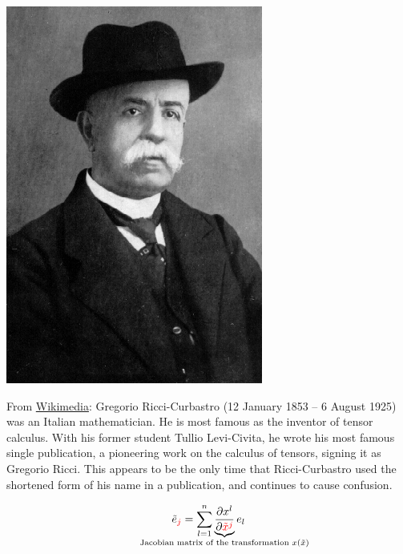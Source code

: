 \documentclass[../main.tex]{subfiles}
\begin{document}
\begin{marginfigure}
	\includegraphics[width=1\linewidth]{images/Ricci_Curbastro_(cropped).jpg}
	\caption[Photo of Gregorio Ricci Cubastro]{From \href{https://commons.wikimedia.org/wiki/File:Ricci_Curbastro_(cropped).jpg}{Wikimedia}: Gregorio Ricci-Curbastro (12 January 1853 – 6 August 1925) was an Italian mathematician. He is most famous as the inventor of tensor calculus. With his former student Tullio Levi-Civita, he wrote his most famous single publication, a pioneering work on the calculus of tensors, signing it as Gregorio Ricci. This appears to be the only time that Ricci-Curbastro used the shortened form of his name in a publication, and continues to cause confusion.}
\end{marginfigure}
\[
\tilde{e}_{\textcolor{red}{j}}=\sum_{l=1}^n\underbrace{\frac{\partial x^l}{\partial\textcolor{red}{\tilde{x}^j}}}_{\mathclap{\text{Jacobian matrix of the transformation $x(\tilde{x})$}}}e_l
\]
\end{document}
